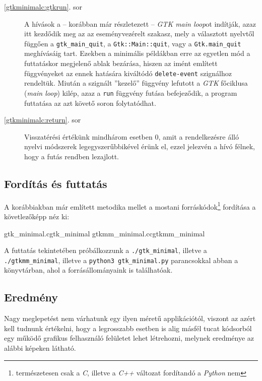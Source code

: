 \begin{description}
 \item[\ref{gtkminimalc:gtkrun}. sor] A hívások a -- korábban már részletezett -- \textit{GTK main loop}ot indítják, azaz itt kezdődik meg az az eseményvezérelt szakasz, mely a választott nyelvtől függően a \texttt{gtk\_main\_quit}, a \texttt{Gtk::Main::quit}, vagy a \texttt{Gtk.main\_quit} meghívásáig tart. Ezekben a minimális példákban erre az egyetlen mód a futtatáskor megjelenő ablak bezárása, hiszen az imént említett függvényeket az ennek hatására kiváltódó \texttt{delete-event} szignálhoz rendeltük.  Miután a szignált ''kezelő'' függvény lefutott a \textit{GTK} főciklusa (\textit{main loop}) kilép, azaz a \texttt{run} függvény futása befejeződik, a program futtatása az azt követő soron folytatódhat.

 \item[\ref{gtkminimalc:return}. sor] Visszatérési értékünk mindhárom esetben 0, amit a rendelkezésre álló nyelvi módszerek legegyszerűbbikével érünk el, ezzel jelezvén a hívó félnek, hogy a futás rendben lezajlott.
\end{description}

\subsection{Fordítás és futtatás}

A korábbiakban már említett metodika mellet a mostani forráskódok\footnote{természetesen csak a \textit{C}, illetve a \textit{C++} változat fordítandó a \textit{Python} nem} fordítása a követlezőképp néz ki:

\lstcompiles
{gtk_minimal.c}{gtk_minimal}
{gtkmm_minimal.cc}{gtkmm_minimal}

A futtatás tekintetében próbálkozzunk a \texttt{./gtk\_minimal}, illetve a \texttt{./gtkmm\_minimal}, illetve a \texttt{python3 gtk\_minimal.py} parancsokkal abban a könyvtárban, ahol a forrásállományaink is találhatóak.

\subsection{Eredmény}

Nagy meglepetést nem várhatunk egy ilyen méretű applikációtól, viszont az azért kell tudnunk értékelni, hogy a legrosszabb esetben is alig másfél tucat kódsorból egy működő grafikus felhasználó felületet lehet létrehozni, melynek eredménye az alábbi képeken látható.

